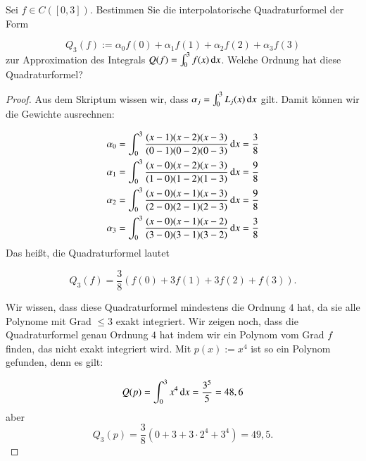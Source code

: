 
\begin{exercise}
  Sei $f \in C([0,3])$. Bestimmen Sie die interpolatorische Quadraturformel der Form

  \begin{equation*}
     Q_3(f):=\alpha_0f(0)+\alpha_1f(1)+\alpha_2f(2)+\alpha_3f(3)
  \end{equation*}
  zur Approximation des Integrals $Q(f)=\int_0^3{f(x) \dif x}$. Welche Ordnung hat diese Quadraturformel?
\end{exercise}
\begin{proof}
  Aus dem Skriptum wissen wir, dass $\alpha_j=\int_0^3{L_j(x) \dif x}$ gilt. Damit können wir die Gewichte ausrechnen:

  \begin{equation*}
    \begin{split}
      \alpha_0&=\int_0^3{\frac{(x-1)(x-2)(x-3)}{(0-1)(0-2)(0-3)} \dif x} = \frac{3}{8} \\
      \alpha_1&=\int_0^3{\frac{(x-0)(x-2)(x-3)}{(1-0)(1-2)(1-3)} \dif x} = \frac{9}{8} \\
      \alpha_2&=\int_0^3{\frac{(x-0)(x-1)(x-3)}{(2-0)(2-1)(2-3)} \dif x} = \frac{9}{8} \\
      \alpha_3&=\int_0^3{\frac{(x-0)(x-1)(x-2)}{(3-0)(3-1)(3-2)} \dif x} = \frac{3}{8} \\
    \end{split}
  \end{equation*}
  Das heißt, die Quadraturformel lautet

  \begin{equation*}
    Q_3(f)=\frac{3}{8}(f(0)+3f(1)+3f(2)+f(3)).
  \end{equation*}

  Wir wissen, dass diese Quadraturformel mindestens die Ordnung $4$ hat, da sie alle Polynome mit Grad $\leq 3$ exakt integriert. Wir zeigen noch, dass die Quadraturformel genau Ordnung $4$ hat indem wir ein Polynom vom Grad $f$ finden, das nicht exakt integriert wird. Mit $p(x):=x^4$ ist so ein Polynom gefunden, denn es gilt:

  \begin{equation*}
    Q(p)=\int_0^3{x^4 \dif x} = \frac{3^5}{5}=48,6
  \end{equation*}
  aber
  \begin{equation*}
    Q_3(p)=\frac{3}{8}(0 + 3 + 3\cdot 2^4 + 3^4)=49,5.
  \end{equation*}
\end{proof}

